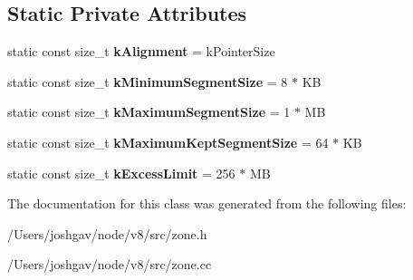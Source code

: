 \subsection*{Static Private Attributes}
\begin{DoxyCompactItemize}
\item 
static const size\+\_\+t {\bfseries k\+Alignment} = k\+Pointer\+Size\hypertarget{classv8_1_1internal_1_1_zone_ac718553a9b3c112fabc7d0569f4a63bd}{}\label{classv8_1_1internal_1_1_zone_ac718553a9b3c112fabc7d0569f4a63bd}

\item 
static const size\+\_\+t {\bfseries k\+Minimum\+Segment\+Size} = 8 $\ast$ KB\hypertarget{classv8_1_1internal_1_1_zone_a0a44cdc6187ff9b24b47dd79691a94ae}{}\label{classv8_1_1internal_1_1_zone_a0a44cdc6187ff9b24b47dd79691a94ae}

\item 
static const size\+\_\+t {\bfseries k\+Maximum\+Segment\+Size} = 1 $\ast$ MB\hypertarget{classv8_1_1internal_1_1_zone_a1c06897b66abe44c13f4d1285e00a68d}{}\label{classv8_1_1internal_1_1_zone_a1c06897b66abe44c13f4d1285e00a68d}

\item 
static const size\+\_\+t {\bfseries k\+Maximum\+Kept\+Segment\+Size} = 64 $\ast$ KB\hypertarget{classv8_1_1internal_1_1_zone_ad5351c755038a33c24b85d3907ac1267}{}\label{classv8_1_1internal_1_1_zone_ad5351c755038a33c24b85d3907ac1267}

\item 
static const size\+\_\+t {\bfseries k\+Excess\+Limit} = 256 $\ast$ MB\hypertarget{classv8_1_1internal_1_1_zone_a021d983d039201caa3d5349ad3c3980d}{}\label{classv8_1_1internal_1_1_zone_a021d983d039201caa3d5349ad3c3980d}

\end{DoxyCompactItemize}


The documentation for this class was generated from the following files\+:\begin{DoxyCompactItemize}
\item 
/\+Users/joshgav/node/v8/src/zone.\+h\item 
/\+Users/joshgav/node/v8/src/zone.\+cc\end{DoxyCompactItemize}
